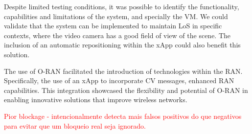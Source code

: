 Despite limited testing conditions, it was possible to identify the functionality, capabilities and limitations of the system, and specially the VM\@.
We could validate that the system can be implemented to maintain LoS in specific contexts, where the video camera has a good field of view of the scene.
The inclusion of an automatic repositioning within the xApp could also benefit this solution.

The use of O-RAN facilitated the introduction of technologies within the RAN\@.
Specifically, the use of an xApp to incorporate CV messages, enhanced RAN capabilities.
This integration showcased the flexibility and potential of O-RAN in enabling innovative solutions that improve wireless networks.

\textcolor{red}{Pior blockage - intencionalmente detecta mais falsos positivos do que negativos para evitar que um bloqueio  real seja ignorado.}

